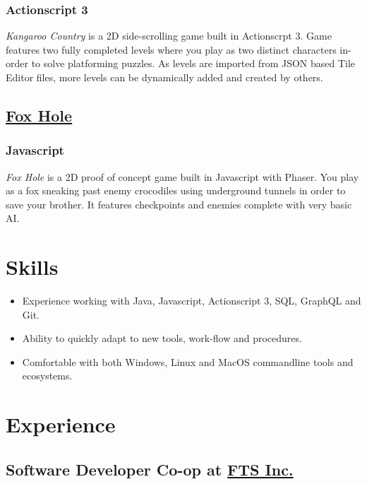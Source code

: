 \documentclass[letterpaper]{article}
\begin{document}
\subsubsection{Actionscript 3}
\label{sec:orgae93b6c}
\emph{Kangaroo Country} is a 2D side-scrolling game built in Actionscrpt 3. Game features two fully completed levels where you play as two distinct characters in-order to solve platforming puzzles. As levels are imported from JSON based Tile Editor files, more levels can be dynamically added and created by others.
\iffalse
\begin{center}
\texttt{[image: ./images/kangaroo/2.png]}
\end{center}
\fi
\subsection{\href{https://github.com/woofers/fox-hole}{Fox Hole}}
\label{sec:org9121c95}
\subsubsection{Javascript}
\label{sec:org83720a4}
\emph{Fox Hole} is a 2D proof of concept game built in Javascript with Phaser. You play as a fox sneaking past enemy crocodiles using underground tunnels in order to save your brother. It features checkpoints and enemies complete with very basic AI.
\iffalse
\begin{center}
\texttt{[image: ./images/fox/1.png]}
\end{center}
\fi
\section{Skills}
\label{sec:org06c9ee3}
\begin{itemize}
\item Experience working with Java, Javascript, Actionscript 3, SQL, GraphQL and Git.
\item Ability to quickly adapt to new tools, work-flow and procedures.
\item Comfortable with both Windows, Linux and MacOS commandline tools and ecosystems.
\end{itemize}
\toggleurlstyle
\section{Experience}
\label{sec:org786fcd4}
\subsection{Software Developer Co-op at \href{https://ftsinc.com}{FTS Inc.}}
\label{sec:orga63c7a1}
\end{document}
